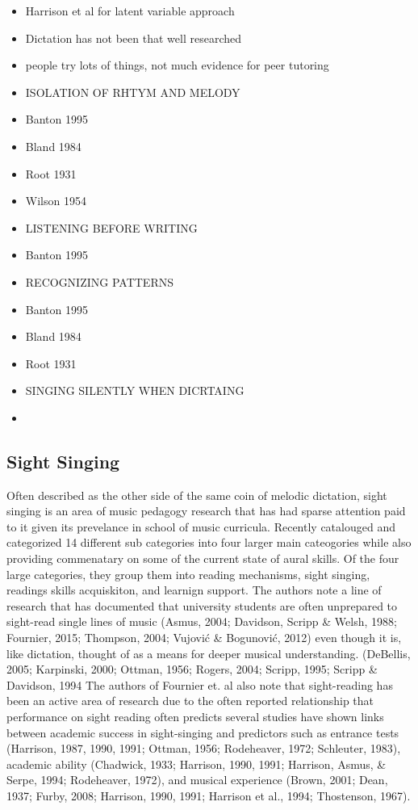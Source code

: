 \documentclass[]{book}
\theoremstyle{definition}
\theoremstyle{definition}
\theoremstyle{definition}
\theoremstyle{remark}
\begin{document}
\begin{itemize}
\item
  Harrison et al for latent variable approach
\item
  Dictation has not been that well researched
  \citep{furbyEffectsPeerTutoring2016}
\item
  people try lots of things, not much evidence for peer tutoring
  \citep{furbyEffectsPeerTutoring2016}
\item
  ISOLATION OF RHTYM AND MELODY
\item
  Banton 1995
\item
  Bland 1984
\item
  Root 1931
\item
  Wilson 1954
\item
  LISTENING BEFORE WRITING
\item
  Banton 1995
\item
  RECOGNIZING PATTERNS
\item
  Banton 1995
\item
  Bland 1984
\item
  Root 1931
\item
  SINGING SILENTLY WHEN DICRTAING
\item
  \citep{klonoskiImprovingDictationAuralSkills2006}
\end{itemize}

\hypertarget{sight-singing}{%
\subsection{Sight Singing}\label{sight-singing}}

Often described as the other side of the same coin of melodic dictation,
sight singing is an area of music pedagogy research that has had sparse
attention paid to it given its prevelance in school of music curricula.
Recently \citep{fournierCognitiveStrategiesSightsinging2017a} catalouged
and categorized 14 different sub categories into four larger main
cateogories while also providing commenatary on some of the current
state of aural skills. Of the four large categories, they group them
into reading mechanisms, sight singing, readings skills acquiskiton, and
learnign support. The authors note a line of research that has
documented that university students are often unprepared to sight-read
single lines of music (Asmus, 2004; Davidson, Scripp \& Welsh, 1988;
Fournier, 2015; Thompson, 2004; Vujović \& Bogunović, 2012) even though
it is, like dictation, thought of as a means for deeper musical
understanding. (DeBellis, 2005; Karpinski, 2000; Ottman, 1956; Rogers,
2004; Scripp, 1995; Scripp \& Davidson, 1994 The authors of Fournier et.
al also note that sight-reading has been an active area of research due
to the often reported relationship that performance on sight reading
often predicts several studies have shown links between academic success
in sight-singing and predictors such as entrance tests (Harrison, 1987,
1990, 1991; Ottman, 1956; Rodeheaver, 1972; Schleuter, 1983), academic
ability (Chadwick, 1933; Harrison, 1990, 1991; Harrison, Asmus, \&
Serpe, 1994; Rodeheaver, 1972), and musical experience (Brown, 2001;
Dean, 1937; Furby, 2008; Harrison, 1990, 1991; Harrison et al., 1994;
Thostenson, 1967).
\end{document}
